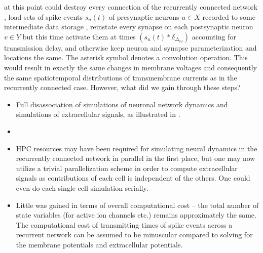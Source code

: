 at this point could destroy every connection of the recurrently connected network ,
load sets of spike events $s_u(t)$ of presynaptic neurons $u \in X$ recorded to some intermediate data storage  ,
reinstate every synapse on each postsynaptic neuron $v \in Y$ but this time activate them at times
$\left(s_u(t) \ast \delta_{\Delta_{vu}}\right)$
accounting for transmission delay,
and otherwise keep neuron and synapse parameterization and locations the same.
The asterisk symbol denotes a convolution operation.
This would result in exactly the same changes in membrane voltages and consequently the same spatiotemporal distributions of transmembrane currents as in the recurrently connected case. 
However, what did we gain through these steps?

\begin{itemize}
\item Full disassociation of simulations of neuronal network dynamics and simulations of extracellular signals,
as illustrated in .
\item {}
\item HPC resources may have been required for simulating neural dynamics in the recurrently connected network in parallel in the first place,
but one may now utilize a trivial parallelization scheme in order to compute extracellular signals as contributions of each cell is independent of the others.
One could even do each single-cell simulation serially.
\item Little was gained in terms of overall computational cost -- the total number of state variables (for active ion channels etc.) remains approximately the same.
The computational cost of transmitting times of spike events across a recurrent network can be assumed to be minuscular compared to solving for the membrane potentials and extracellular potentials.
\end{itemize}

